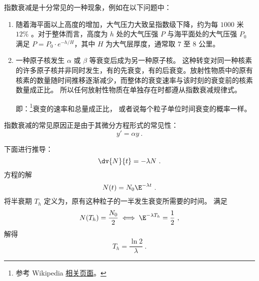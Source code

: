 
\begin{issues}
\issueDraft
\end{issues}


指数衰减是十分常见的一种现象，例如在以下问题中：

\begin{enumerate}
\item 随着海平面以上高度的增加，大气压力大致呈指数级下降，约为每 $1000$ 米 $12\%$ 。对于整体而言，高度为 $h$ 处的大气压强 $P$ 与海平面处的大气压强 $P_0$ 满足 $P = P_0 \cdot e^{-h/H}$，其中 $H$ 为大气层厚度，通常取 $7$ 至 $8$ 公里。
\item 一种原子核发生 $\alpha$ 或 $\beta$ 等衰变后成为另一种原子核。
这种转变对同一种核素的许多原子核并非同时发生，有的先衰变，有的后衰变。放射性物质中的原有核素的数量随时间推移逐渐减少，而整体的衰变速率与该时刻的衰变前的核素数量成正比。
所以任何放射性物质在单独存在时都遵从指数衰减规律式。

即：\footnote{参考 Wikipedia \href{https://en.wikipedia.org/wiki/Exponential_decay}{相关页面}。}衰变的速率和总量成正比， 或者说每个粒子单位时间衰变的概率一样。
\end{enumerate}

指数衰减的常见原因正是由于其微分方程形式的常见性：
$$y' = \alpha y ~.$$

下面进行推导：
\begin{equation}
\dv{N}{t} = -\lambda N~.
\end{equation}
方程的解
\begin{equation}
N(t) = N_0 \E^{-\lambda t}~.
\end{equation}
将半衰期 $T_h$ 定义为，原有这种粒子的一半发生衰变所需要的时间。 满足
\begin{equation}
N(T_h) = \frac{N_0}{2} \iff \E^{-\lambda T_h} = \frac{1}{2}~,
\end{equation}
解得
\begin{equation}
T_h = \frac{\ln 2}{\lambda}~.
\end{equation}

